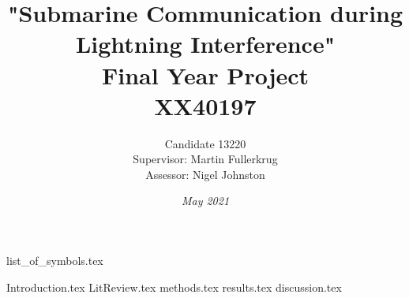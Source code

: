 \documentclass[11pt, oneside, a4paper]{report}
\begin{document}
\begin{titlepage}
    \title{"Submarine Communication during Lightning Interference"\\ Final Year Project \\ XX40197}
    \author{Candidate 13220
    \\[0.5cm]
    Supervisor: Martin Fullerkrug
    \\[0.5cm] 
    Assessor: Nigel Johnston}
    \date{\textit{May 2021}}
\end{titlepage}



\maketitle
\renewcommand{\abstractname}{Summary}

\pagestyle{empty}
\tableofcontents


\newpage
{}
\renewcommand{\thesection}{\Roman{section}}
\listoffigures
\pagestyle{fancy}
\pagebreak
{}
\listoftables
\pagebreak

{list_of_symbols.tex}
\newpage
\setcounter{section}{0}

\setcounter{page}{1}
\renewcommand{\thesection}{\arabic{chapter}.\arabic{section}}
{Introduction.tex}
\pagebreak
{LitReview.tex}
\pagebreak
{methods.tex}
\pagebreak
{results.tex}
\pagebreak
{discussion.tex}
\pagebreak
\renewcommand{\bibname}{References}

\end{document}
